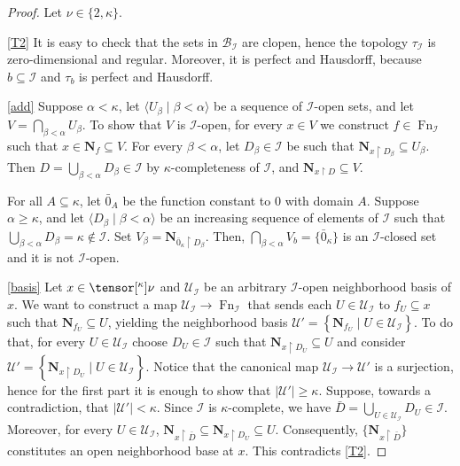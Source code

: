 \documentclass{amsart}
\numberwithin{equation}{section}
\newcommand{\B}{\mathcal{B}}
\newcommand{\I}{\mathcal{I}}
\newcommand{\U}{\mathcal{U}}
\newcommand{\pre}[2]{\tensor[^{#1}]{#2}{}}
\newcommand{\seq}[2]{\langle #1 \mid #2 \rangle}
\newcommand{\Nbhd}{\boldsymbol{N}}
\newcommand{\1}{\mathbf{I}}
\newcommand{\2}{\mathbf{II}}
\renewcommand{\a}{\alpha}
\renewcommand{\b}{\beta}
\renewcommand{\k}{\kappa}
\DeclareMathOperator{\Fn}{Fn}
\newcommand{\clopen}[1]{\Nbhd_{#1}}
\theoremstyle{definition}
\theoremstyle{remark}
\begin{document}
\begin{proof}
Let \(\nu \in \{2,\k\}\).

\ref{T2} It is easy to check that the sets in \(\B_\I\) are clopen, hence the topology \(\tau_\I\) is zero-dimensional and regular. Moreover, it is perfect and Hausdorff, because \(b \subseteq \I \) and \( \tau_b\) is perfect and Hausdorff. 

\ref{add} Suppose \(\a <\k\), let \(\seq{ U_\b}{\b<\a} \) be a sequence of \(\I\)-open sets, and let \(V=\bigcap_{\b<\a}U_\b\). To show that \(V \) is \(\I\)-open, for every \(x\in V\) we construct  \(f \in \Fn_\I \) such that \(x \in \clopen{f} \subseteq V\). For every \(\b<\a\), let \(D_\b \in \I\) be such that \(\clopen{x\restriction D_\b} \subseteq U_\b\). Then \(D=\bigcup_{\b<\a}D_\b \in \I\) by \(\k\)-completeness of \(\I\), and \(\clopen{x\restriction D} \subseteq V\). 

For all $A\subseteq\kappa$, let $\bar 0_A$ be the function constant to $0$ with domain $A$. Suppose \(\a \geq \k\), and let \(\seq{ D_\b}{\b<\a}\) be an increasing sequence of elements of \(\I\) such that \(\bigcup_{\b<\a}D_\b =\k \notin \I\). Set \(V_\b=\clopen{\bar 0_\k \restriction D_\b}\). Then, \(\bigcap_{\b<\a}V_b=\{\bar 0_{\k}\}\) is an \(\I\)-closed set and it is not \(\I\)-open.

\ref{basis} Let \(x \in \pre{\k}{\nu}\) and \(\U_\I\) be an arbitrary \(\I\)-open neighborhood basis of \(x\). We want to construct a map \(\U_\I \to \Fn_\I\) that sends each \(U \in \U_\I\) to \(f_U \subseteq x\) such that \(\clopen{f_U} \subseteq U \), yielding the neighborhood basis \(\U'=   \left\lbrace \clopen{f_U} \mid U \in \U_\I \right\rbrace \). To do that, for every \(U \in \U_\I\) choose \(D_U \in \I\) such that \(\clopen{x\restriction D_U } \subseteq U \) and consider \(\U'=\left\lbrace \clopen{x\restriction D_U } \mid U \in \U_\I \right\rbrace \). %
Notice that the canonical map \(\U_\I \to \U'\) is a surjection, hence for the first part it is enough to show that \(|\U'|\ge \k\). 
Suppose, towards a contradiction, that \( |\U'|< \k\). Since \(\I\) is \(\k\)-complete, we have \(\bar{D} = \bigcup_{U \in \U_\I} D_U \in \I\). Moreover, for every \(U \in \U_\I\), 
\(\Nbhd_{x\restriction \bar{D}} \subseteq \Nbhd_{x\restriction D_U} \subseteq U\). 
Consequently,  \(\{\Nbhd_{x\restriction \bar{D}}\}\) constitutes an open neighborhood base at \(x\). This contradicts \ref{T2}. %




\end{proof}
\end{document}
